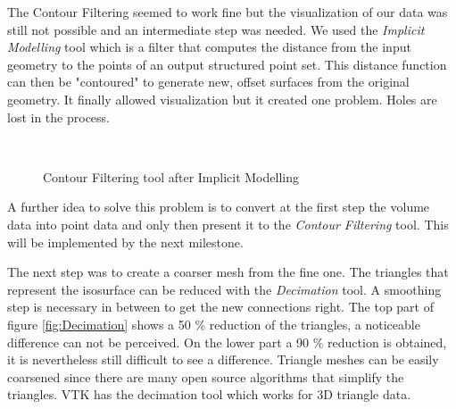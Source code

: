 The Contour Filtering seemed to work fine but the visualization of our data was still not possible
and an intermediate step was needed. We used the \textit{Implicit Modelling} tool which is a filter that
computes the distance from the input geometry to the points of an output structured point set.
This distance function can then be "contoured" to generate new, offset surfaces from the original
geometry. It finally allowed visualization but it created one problem. Holes are lost in
the process.

\begin{figure}
\centering
   \\
   \caption{Contour Filtering tool after Implicit Modelling}
\end{figure}

A further idea to solve this problem is to convert at the first step the volume data into point data
and only then present it to the \textit{Contour Filtering} tool. This will be implemented by the next
milestone.

The next step was to create a coarser mesh from the fine one. The triangles that represent the
isosurface can be reduced with the \textit{Decimation} tool. A smoothing step is necessary in between
to get the new connections right. The top part of figure \ref{fig:Decimation} shows a 50 \% reduction of the
triangles, a noticeable difference can not be perceived. On the lower part a 90 \% reduction is
obtained, it is nevertheless still difficult to see a difference. Triangle meshes can be easily
coarsened since there are many open source algorithms that simplify the triangles. VTK has the
decimation tool which works for 3D triangle data.

